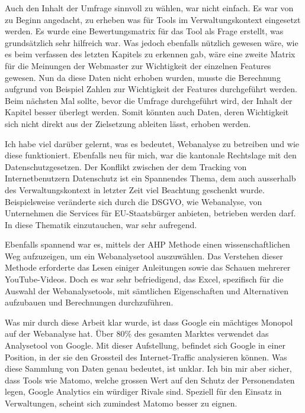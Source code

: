Auch den Inhalt der Umfrage sinnvoll zu wählen, war nicht einfach. Es war von zu Beginn angedacht, zu erheben was für Tools im Verwaltungskontext eingesetzt werden. Es wurde eine Bewertungsmatrix für das Tool als Frage erstellt, was grundsätzlich sehr hilfreich war. Was jedoch ebenfalls nützlich gewesen wäre, wie es beim verfassen des letzten Kapitels zu erkennen gab, wäre eine zweite Matrix für die Meinungen der Webmaster zur Wichtigkeit der einzelnen Features gewesen. Nun da diese Daten nicht erhoben wurden, musste die Berechnung aufgrund von Beispiel Zahlen zur Wichtigkeit der Features durchgeführt werden. Beim nächsten Mal sollte, bevor die Umfrage durchgeführt wird, der Inhalt der Kapitel besser überlegt werden. Somit könnten auch Daten, deren Wichtigkeit sich nicht direkt aus der Zielsetzung ableiten lässt, erhoben werden.

Ich habe viel darüber gelernt, was es bedeutet, Webanalyse zu betreiben und wie diese funktioniert. Ebenfalls neu für mich, war die kantonale Rechtslage mit den Datenschutzgesetzen. Der Konflikt zwischen der dem Tracking von Internetbenutzern Datenschutz ist ein Spannendes Thema, dem auch ausserhalb des Verwaltungskontext in letzter Zeit viel Beachtung geschenkt wurde. Beispielsweise veränderte sich durch die DSGVO, wie Webanalyse, von Unternehmen die Services für EU-Staatsbürger anbieten, betrieben werden darf. In diese Thematik einzutauchen, war sehr aufregend. 

Ebenfalls spannend war es, mittels der AHP Methode einen wissenschaftlichen Weg aufzuzeigen, um ein Webanalysetool auszuwählen. Das Verstehen dieser Methode erforderte das Lesen einiger Anleitungen sowie das Schauen mehrerer YouTube-Videos. Doch es war sehr befriedigend, das Excel, spezifisch für die Auswahl der Webanalysetools, mit sämtlichen Eigenschaften und Alternativen aufzubauen und Berechnungen durchzuführen.

Was mir durch diese Arbeit klar wurde, ist dass Google ein mächtiges Monopol auf der Webanalyse hat. Über 80\% des gesamten Marktes verwendet das Analysetool von Google. Mit dieser Aufstellung, befindet sich Google in einer Position, in der sie den Grossteil des Internet-Traffic analysieren können. Was diese Sammlung von Daten genau bedeutet, ist unklar. Ich bin mir aber sicher, dass Tools wie Matomo, welche grossen Wert auf den Schutz der Personendaten legen, Google Analytics ein würdiger Rivale sind. Speziell für den Einsatz in Verwaltungen, scheint sich zumindest Matomo besser zu eignen.